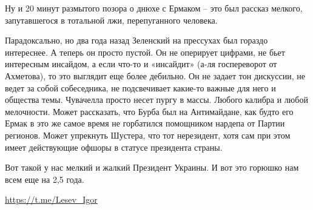 Ну и 20 минут размытого позора о днюхе с Ермаком – это был рассказ мелкого,
запутавшегося в тотальной лжи, перепуганного человека.

Парадоксально, но два года назад Зеленский на прессухах был гораздо интереснее.
А теперь он просто пустой. Он не оперирует цифрами, не бьет интересным
инсайдом, а если что-то и «инсайдит» (а-ля госпереворот от Ахметова), то это
выглядит еще более дебильно. Он не задает тон дискуссии, не ведет за собой
собеседника, не подсвечивает какие-то важные для него и общества темы.
Чувачелла просто несет пургу в массы. Любого калибра и любой мелочности. Может
рассказать, что Бурба был на Антимайдане, как будто его Ермак в это же самое
время не горбатился помощником нардепа от Партии регионов. Может упрекнуть
Шустера, что тот нерезидент, хотя сам при этом имеет действующие офшоры в
статусе президента страны.

Вот такой у нас мелкий и жалкий Президент Украины. И вот это горюшко нам всем
еще на 2,5 года.

\url{https://t.me/Lesev_Igor}
